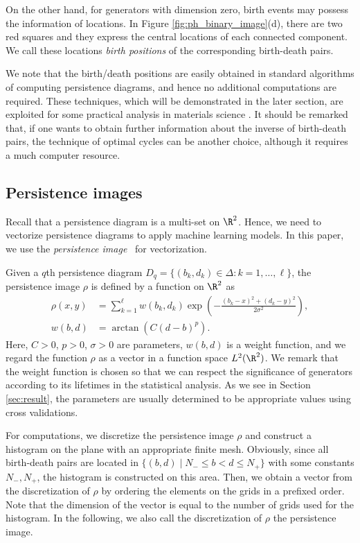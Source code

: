 \documentclass[smallextended]{svjour3}
\begin{document}
On the other hand, for generators with dimension zero, birth events may possess the information of locations. In Figure \ref{fig:ph_binary_image}(d), there are two red squares and they express the central locations of each connected component. We call these locations \emph{birth positions} of the corresponding birth-death pairs. 

We note that the birth/death positions are easily obtained in standard algorithms of computing persistence diagrams, and hence no additional computations are required. These techniques, which will be demonstrated in the later section, are exploited for some practical analysis in materials science \citep{iron}. It should be remarked that, if one wants to obtain further information about the inverse of birth-death pairs, the technique of optimal cycles \citep{optimal1,optimal2} can be another choice, although it requires a much computer resource. 




\subsection{Persistence images}
Recall that a persistence diagram is a multi-set on $\R^2$. Hence, we need to vectorize persistence diagrams to apply  machine learning models. In this paper, we use the \emph{persistence image}~\citep{persistence_image} for vectorization. 

Given a $q$th persistence diagram $D_{q} = \{(b_k,d_k)\in\Delta\colon k=1,\dots,\ell\}$, the persistence image $\rho$ is defined by a function on $\R^2$ as
\begin{align}
  \rho(x, y) &= \sum_{k=1}^\ell w(b_k, d_k) \exp\left(-\frac{(b_k-x)^2 + (d_k - y)^2}{2 \sigma^2}\right), \nonumber\\
  w(b, d) &= \arctan ( C (d - b)^p). \label{eq:weight}
\end{align}
Here, $C > 0$, $p > 0$, $\sigma > 0$ are parameters, $w(b, d)$ is a 
weight function, and we regard the function $\rho$ as a vector in a function space $L^2(\R^2)$. We remark that the weight function is chosen so that we can respect the significance of generators according to its lifetimes in the statistical analysis. As we see in Section \ref{sec:result}, the parameters are usually determined to be appropriate values using cross validations. 

For computations, we discretize the persistence image $\rho$ and construct a histogram on the plane with an appropriate finite mesh. 
Obviously, since all birth-death pairs are located in 
$\{(b, d) \mid N_- \leq b < d \leq N_+ \}$ with some constants $N_-,N_+$, the histogram is constructed on this area.
Then, we obtain a vector from the discretization of $\rho$ by ordering the elements on the grids in a prefixed order. Note that the dimension of the  vector is equal to the number of grids used for the histogram. In the following, we also call the discretization of $\rho$ the persistence image. 
\end{document}
